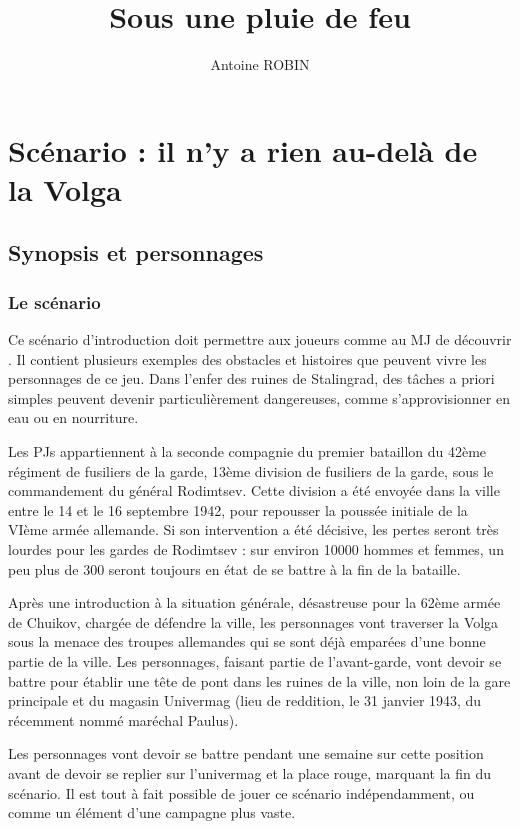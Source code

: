 \documentclass{report}
\title{Sous une pluie de feu}
\author{Antoine ROBIN }
\date{}
\begin{document}
\chapter{Scénario : il n'y a rien au-delà de la Volga}
\begin{multicols}{2}
\setlength{\columnsep}{0.5cm}
\setlength{\columnseprule}{0.5pt}

\section{Synopsis et personnages}
\subsection{Le scénario}
Ce scénario d'introduction doit permettre aux joueurs comme au MJ de découvrir \diminutif. Il contient plusieurs exemples des obstacles et histoires que peuvent vivre les personnages de ce jeu. Dans l'enfer des ruines de Stalingrad, des tâches a priori simples peuvent devenir particulièrement dangereuses, comme s'approvisionner en eau ou en nourriture.

Les PJs appartiennent à la seconde compagnie du premier bataillon du 42ème régiment de fusiliers de la garde, 13ème division de fusiliers de la garde, sous le commandement du général Rodimtsev. Cette division a été envoyée dans la ville entre le 14 et le 16 septembre 1942, pour repousser la poussée initiale de la VIème armée allemande. Si son intervention a été décisive, les pertes seront très lourdes pour les gardes de Rodimtsev : sur environ 10000 hommes et femmes, un peu plus de 300 seront toujours en état de se battre à la fin de la bataille.

Après une introduction à la situation générale, désastreuse pour la 62ème armée de Chuikov, chargée de défendre la ville, les personnages vont traverser la Volga sous la menace des troupes allemandes qui se sont déjà emparées d'une bonne partie de la ville. Les personnages, faisant partie de l'avant-garde, vont devoir se battre pour établir une tête de pont dans les ruines de la ville, non loin de la gare principale et du magasin Univermag (lieu de reddition, le 31 janvier 1943, du récemment nommé maréchal Paulus).

Les personnages vont devoir se battre pendant une semaine sur cette position avant de devoir se replier sur l'univermag et la place rouge, marquant la fin du scénario. Il est tout à fait possible de jouer ce scénario indépendamment, ou comme un élément d'une campagne plus vaste.

\end{multicols}
\end{document}
